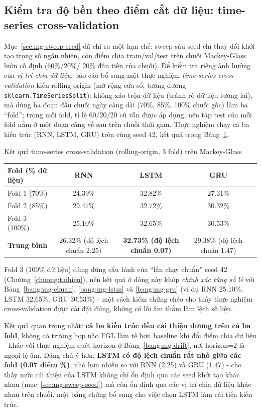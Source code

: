 \subsection{Kiểm tra độ bền theo điểm cắt dữ liệu: time-series cross-validation}
\label{sec:mg-cv}

Mục~\ref{sec:mg-sweep-seed} đã chỉ ra một hạn chế: sweep sáu seed chỉ thay đổi khởi tạo trọng
số ngẫu nhiên, còn điểm chia train/val/test trên chuỗi Mackey-Glass luôn cố định (60\%/20\%/
20\% đầu tiên của chuỗi). Để kiểm tra riêng ảnh hưởng của \textit{vị trí chia dữ liệu}, báo cáo
bổ sung một thực nghiệm \textit{time-series cross-validation} kiểu rolling-origin (mở rộng cửa
sổ, tương đương \texttt{sklearn.TimeSeriesSplit}): không xáo trộn dữ liệu (tránh rò dữ liệu
tương lai), mà dùng ba đoạn đầu chuỗi ngày càng dài (70\%, 85\%, 100\% chuỗi gốc) làm ba
``fold''; trong mỗi fold, tỉ lệ 60/20/20 cũ vẫn được áp dụng, nên tập test của mỗi fold nằm ở
một đoạn càng về sau trên chuỗi thời gian. Thực nghiệm chạy cả ba kiến trúc (RNN, LSTM, GRU)
trên cùng seed 42, kết quả trong Bảng~\ref{bang:mg-cv}.

\begin{table}[H]{Kết quả time-series cross-validation (rolling-origin, 3 fold) trên Mackey-Glass}
	\label{bang:mg-cv}
	\centering
	\begin{tabular}{lcccc}
		\toprule
		\textbf{Fold (\% dữ liệu)} & \textbf{RNN} & \textbf{LSTM} & \textbf{GRU} \\
		\midrule
		Fold 1 (70\%) & 24.39\% & 32.82\% & 27.31\% \\
		Fold 2 (85\%) & 29.47\% & 32.72\% & 30.32\% \\
		Fold 3 (100\%) & 25.10\% & 32.65\% & 30.53\% \\
		\midrule
		\textbf{Trung bình} & 26.32\% (độ lệch chuẩn 2.25) & \textbf{32.73\% (độ lệch chuẩn 0.07)} & 29.38\% (độ lệch chuẩn 1.47) \\
		\bottomrule
	\end{tabular}
\end{table}

Fold 3 (100\% dữ liệu) dùng đúng cấu hình của ``lần chạy chuẩn'' seed 42
(Chương~\ref{chuong:taihien}), nên kết quả ở dòng này khớp \textit{chính xác từng số lẻ} với
Bảng~\ref{bang:mg-chuan}, \ref{bang:mg-lstm} và \ref{bang:mg-gru} (ví dụ RNN 25.10\%, LSTM
32.65\%, GRU 30.53\%) - một cách kiểm chứng chéo cho thấy thực nghiệm cross-validation được
cài đặt đúng, không có lỗi âm thầm làm lệch số liệu.

Kết quả quan trọng nhất: \textbf{cả ba kiến trúc đều cải thiện dương trên cả ba fold}, không
có trường hợp nào FGL làm tệ hơn baseline khi đổi điểm chia dữ liệu - khác với thực nghiệm
quét horizon ở Bảng~\ref{bang:mg-drift}, nơi horizon=2 là ngoại lệ âm. Đáng chú ý hơn,
\textbf{LSTM có độ lệch chuẩn rất nhỏ giữa các fold (0.07 điểm \%)}, nhỏ hơn nhiều so với RNN
(2.25) và GRU (1.47) - cho thấy mức cải thiện của LSTM không chỉ ổn định qua các seed khởi tạo
khác nhau (mục~\ref{sec:mg-sweep-seed}) mà còn ổn định qua các vị trí chia dữ liệu khác nhau
trên chuỗi, một bằng chứng bổ sung cho việc chọn LSTM làm cải tiến kiến trúc.


